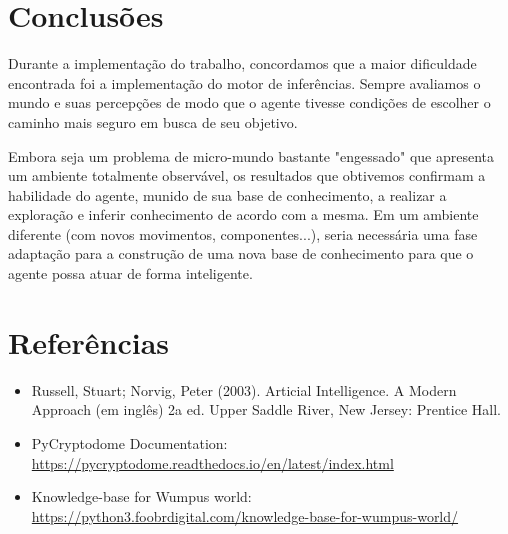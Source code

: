 \documentclass[a4paper, 12pt]{article}
\begin{document}
\section{Conclusões}

Durante a implementação do trabalho, concordamos que a maior dificuldade encontrada foi a implementação do motor de inferências. Sempre avaliamos o mundo e suas percepções de modo que o agente tivesse condições de escolher o caminho mais seguro em busca de seu objetivo. 

Embora seja um problema de micro-mundo bastante "engessado" que apresenta um ambiente totalmente observável, os resultados que obtivemos confirmam a habilidade do agente, munido de sua base de conhecimento, a realizar a exploração e inferir conhecimento de acordo com a mesma. Em um ambiente diferente (com novos movimentos, componentes...), seria necessária uma fase adaptação para a construção de uma nova base de conhecimento para que o agente possa atuar de forma inteligente.

\section*{Referências}

\begin{itemize}
    \item Russell, Stuart; Norvig, Peter (2003). Articial Intelligence. A Modern Approach
(em inglês) 2a ed. Upper Saddle River, New Jersey: Prentice Hall.
    \item PyCryptodome Documentation: \url{https://pycryptodome.readthedocs.io/en/latest/index.html}
    \item Knowledge-base for Wumpus world: \url{https://python3.foobrdigital.com/knowledge-base-for-wumpus-world/}
\end{itemize}
\end{document}
